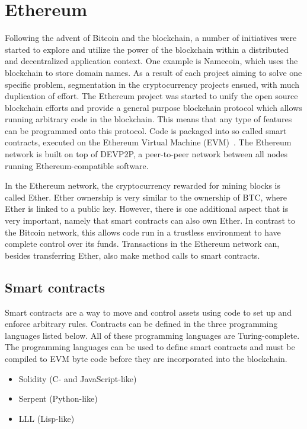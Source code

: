 \section{Ethereum}
Following the advent of Bitcoin and the blockchain, a number of initiatives were started to explore and utilize the power of the blockchain within a distributed and decentralized application context. One example is Namecoin, which uses the blockchain to store domain names. As a result of each project aiming to solve one specific problem, segmentation in the cryptocurrency projects ensued, with much duplication of effort. The Ethereum project was started to unify the open source blockchain efforts and provide a general purpose blockchain protocol which allows running arbitrary code in the blockchain. This means that any type of features can be programmed onto this protocol. Code is packaged into so called smart contracts, executed on the Ethereum Virtual Machine (EVM)~\cite{ethereum:white}. The Ethereum network is built on top of DEVP2P, a peer-to-peer network between all nodes running Ethereum-compatible software.

In the Ethereum network, the cryptocurrency rewarded for mining blocks is called Ether. Ether ownership is very similar to the ownership of BTC, where Ether is linked to a public key. However, there is one additional aspect that is very important, namely that smart contracts can also own Ether. In contrast to the Bitcoin network, this allows code run in a trustless environment to have complete control over its funds. Transactions in the Ethereum network can, besides transferring Ether, also make method calls to smart contracts.

\subsection{Smart contracts}
\label{sec:tech:contracts}
Smart contracts are a way to move and control assets using code to set up and enforce arbitrary rules. Contracts can be defined in the three programming languages listed below. All of these programming languages are Turing-complete. The programming languages can be used to define smart contracts and must be compiled to EVM byte code before they are incorporated into the blockchain.

\begin{itemize}
    \item Solidity (C- and JavaScript-like)
    \item Serpent (Python-like)
    \item LLL (Lisp-like)
\end{itemize}

